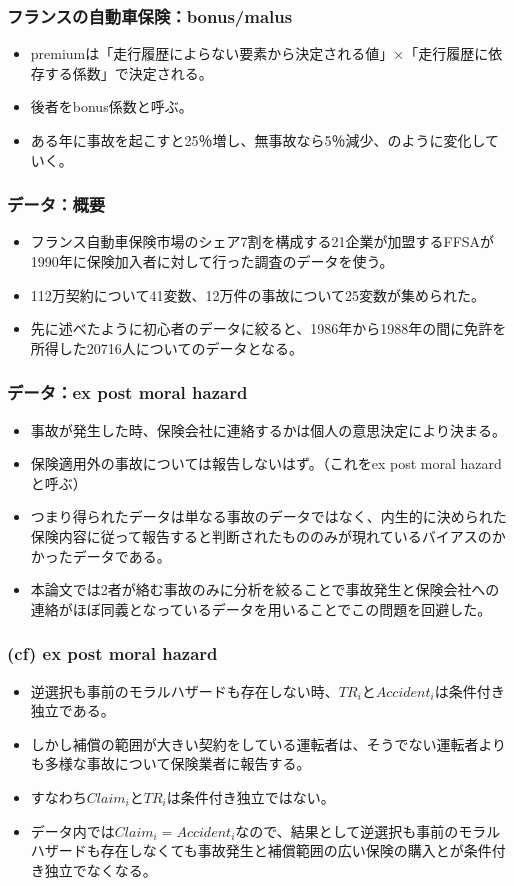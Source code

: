 \documentclass[dvipdfmx, 12pt]{beamer}
\begin{document}
\begin{frame}\frametitle{フランスの自動車保険：bonus/malus}
	\begin{itemize}
	\item premiumは「走行履歴によらない要素から決定される値」×「走行履歴に依存する係数」で決定される。
	\item 後者をbonus係数と呼ぶ。
	\item ある年に事故を起こすと25％増し、無事故なら5％減少、のように変化していく。
	\end{itemize}
\end{frame}

\begin{frame}\frametitle{データ：概要}
	\begin{itemize}
	\item フランス自動車保険市場のシェア7割を構成する21企業が加盟するFFSAが1990年に保険加入者に対して行った調査のデータを使う。
	\item 112万契約について41変数、12万件の事故について25変数が集められた。
	\item 先に述べたように初心者のデータに絞ると、1986年から1988年の間に免許を所得した20716人についてのデータとなる。
	\end{itemize}
\end{frame}

\begin{frame}\frametitle{データ：ex post moral hazard}
	\begin{itemize}
	\item 事故が発生した時、保険会社に連絡するかは個人の意思決定により決まる。
	\item 保険適用外の事故については報告しないはず。（これをex post moral hazardと呼ぶ）
	\item つまり得られたデータは単なる事故のデータではなく、内生的に決められた保険内容に従って報告すると判断されたもののみが現れているバイアスのかかったデータである。
	\item 本論文では2者が絡む事故のみに分析を絞ることで事故発生と保険会社への連絡がほぼ同義となっているデータを用いることでこの問題を回避した。
	\end{itemize}
\end{frame}

\begin{frame}\frametitle{(cf) ex post moral hazard}
	\begin{itemize}
	\item 逆選択も事前のモラルハザードも存在しない時、$TR_i$と$Accident_i$は条件付き独立である。
	\item しかし補償の範囲が大きい契約をしている運転者は、そうでない運転者よりも多様な事故について保険業者に報告する。
	\item すなわち$Claim_i$と$TR_i$は条件付き独立ではない。
	\item データ内では$Claim_i = Accident_i$なので、結果として逆選択も事前のモラルハザードも存在しなくても事故発生と補償範囲の広い保険の購入とが条件付き独立でなくなる。
	\end{itemize}
\end{frame}
\end{document}
